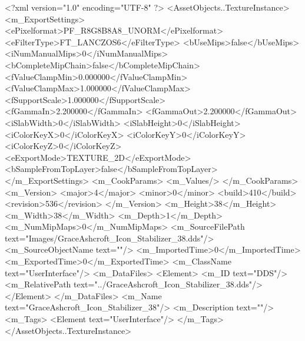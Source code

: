 <?xml version="1.0" encoding="UTF-8" ?>
<AssetObjects..TextureInstance>
	<m_ExportSettings>
		<ePixelformat>PF_R8G8B8A8_UNORM</ePixelformat>
		<eFilterType>FT_LANCZOS6</eFilterType>
		<bUseMips>false</bUseMips>
		<iNumManualMips>0</iNumManualMips>
		<bCompleteMipChain>false</bCompleteMipChain>
		<fValueClampMin>0.000000</fValueClampMin>
		<fValueClampMax>1.000000</fValueClampMax>
		<fSupportScale>1.000000</fSupportScale>
		<fGammaIn>2.200000</fGammaIn>
		<fGammaOut>2.200000</fGammaOut>
		<iSlabWidth>0</iSlabWidth>
		<iSlabHeight>0</iSlabHeight>
		<iColorKeyX>0</iColorKeyX>
		<iColorKeyY>0</iColorKeyY>
		<iColorKeyZ>0</iColorKeyZ>
		<eExportMode>TEXTURE_2D</eExportMode>
		<bSampleFromTopLayer>false</bSampleFromTopLayer>
	</m_ExportSettings>
	<m_CookParams>
		<m_Values/>
	</m_CookParams>
	<m_Version>
		<major>4</major>
		<minor>0</minor>
		<build>410</build>
		<revision>536</revision>
	</m_Version>
	<m_Height>38</m_Height>
	<m_Width>38</m_Width>
	<m_Depth>1</m_Depth>
	<m_NumMipMaps>0</m_NumMipMaps>
	<m_SourceFilePath text="Images/GraceAshcroft_Icon_Stabilizer_38.dds"/>
	<m_SourceObjectName text=""/>
	<m_ImportedTime>0</m_ImportedTime>
	<m_ExportedTime>0</m_ExportedTime>
	<m_ClassName text="UserInterface"/>
	<m_DataFiles>
		<Element>
			<m_ID text="DDS"/>
			<m_RelativePath text="../GraceAshcroft_Icon_Stabilizer_38.dds"/>
		</Element>
	</m_DataFiles>
	<m_Name text="GraceAshcroft_Icon_Stabilizer_38"/>
	<m_Description text=""/>
	<m_Tags>
		<Element text="UserInterface"/>
	</m_Tags>
</AssetObjects..TextureInstance>
